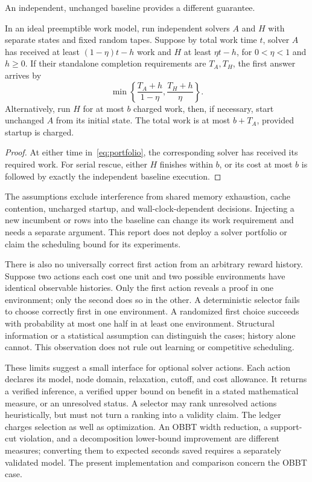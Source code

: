 An independent, unchanged baseline provides a different guarantee.

\begin{proposition}\label{prop:portfolio}
In an ideal preemptible work model, run independent solvers $A$ and $H$
with separate states and fixed random tapes. Suppose by total work time
$t$, solver $A$ has received at least $(1-\eta)t-h$ work and $H$ at
least $\eta t-h$, for $0<\eta<1$ and $h\ge0$. If their standalone
completion requirements are $T_A,T_H$, the first answer arrives by
\begin{equation}\label{eq:portfolio}
 \min\left\{\frac{T_A+h}{1-\eta},\frac{T_H+h}{\eta}\right\}.
\end{equation}
Alternatively, run $H$ for at most $b$ charged work, then, if necessary,
start unchanged $A$ from its initial state. The total work is at most
$b+T_A$, provided startup is charged.
\end{proposition}
\begin{proof}
At either time in~\eqref{eq:portfolio}, the corresponding solver has
received its required work. For serial rescue, either $H$ finishes within
$b$, or its cost at most $b$ is followed by exactly the independent
baseline execution.
\end{proof}

The assumptions exclude interference from shared memory exhaustion,
cache contention, uncharged startup, and wall-clock-dependent decisions.
Injecting a new incumbent or rows into the baseline can change its work
requirement and needs a separate argument. This report does not deploy
a solver portfolio or claim the scheduling bound for its experiments.

There is also no universally correct first action from an arbitrary
reward history. Suppose two actions each cost one unit and two possible
environments have identical observable histories. Only the first action
reveals a proof in one environment; only the second does so in the other.
A deterministic selector fails to choose correctly first in one
environment. A randomized first choice succeeds with probability at most
one half in at least one environment. Structural information or a
statistical assumption can distinguish the cases; history alone cannot.
This observation does not rule out learning or competitive scheduling.

These limits suggest a small interface for optional solver actions.
Each action declares its model, node domain, relaxation, cutoff, and cost
allowance. It returns a verified inference, a verified upper bound on
benefit in a stated mathematical measure, or an unresolved status.
A selector may rank unresolved actions heuristically, but must not turn
a ranking into a validity claim. The ledger charges selection as well as
optimization. An OBBT width reduction, a support-cut violation, and a
decomposition lower-bound improvement are different measures; converting
them to expected seconds saved requires a separately validated model.
The present implementation and comparison concern the OBBT case.
